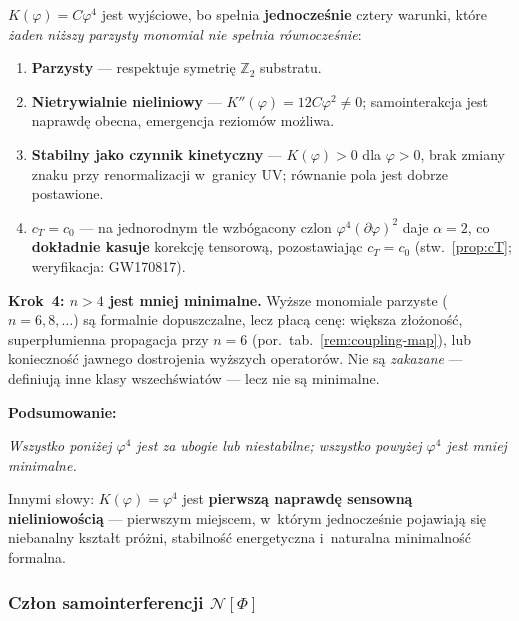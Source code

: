 \begin{remark}[Zasada minimalnej nieliniowo\'sci: dlaczego $K(\varphi) = \varphi^4$]
$K(\varphi) = C\varphi^4$ jest wyj\'sciowe, bo spe\l{}nia \textbf{jednocze\'snie}
cztery warunki, kt\'ore \emph{\.zaden ni\.zszy parzysty monomial nie spe\l{}nia
r\'ownocze\'snie}:
\begin{enumerate}[nosep]
  \item \textbf{Parzysty} --- respektuje symetri\k{e} $\mathbb{Z}_2$ substratu.
  \item \textbf{Nietrywialnie nieliniowy} --- $K''(\varphi) = 12C\varphi^2 \neq 0$;
        samointerakcja jest naprawd\k{e} obecna, emergencja reziom\'ow mo\.zliwa.
  \item \textbf{Stabilny jako czynnik kinetyczny} --- $K(\varphi) > 0$ dla $\varphi > 0$,
        brak zmiany znaku przy renormalizacji w~granicy UV;
        r\'ownanie pola jest dobrze postawione.
  \item \textbf{$c_T = c_0$} --- na jednorodnym tle wzb\'ogacony czlon
        $\varphi^4(\partial\varphi)^2$ daje $\alpha = 2$, co \textbf{dok\l{}adnie kasuje}
        korekcj\k{e} tensorow\k{a}, pozostawiaj\k{a}c $c_T = c_0$
        (stw.~\ref{prop:cT}; weryfikacja: GW170817).
\end{enumerate}

\medskip\noindent
\textbf{Krok~4: $n > 4$ jest mniej minimalne.}
Wy\.zsze monomiale parzyste ($n = 6, 8, \ldots$) s\k{a} formalnie dopuszczalne,
lecz p\l{}ac\k{a} cen\k{e}:
wi\k{e}ksza z\l{}o\.zono\'s\'c, superp\l{}umienna propagacja przy $n = 6$
(por.\ tab.~\ref{rem:coupling-map}),
lub konieczno\'s\'c jawnego dostrojenia wy\.zszych operator\'ow.
Nie s\k{a} \emph{zakazane} --- definiuj\k{a} inne klasy wszech\'swiat\'ow ---
lecz nie s\k{a} minimalne.

\medskip\noindent
\textbf{Podsumowanie:}
\begin{center}
\small
\emph{Wszystko poni\.zej $\varphi^4$ jest za ubogie lub niestabilne;
wszystko powy\.zej $\varphi^4$ jest mniej minimalne.}
\end{center}
Innymi s\l{}owy: $K(\varphi) = \varphi^4$ jest \textbf{pierwsz\k{a}
naprawd\k{e} sensown\k{a} nieliniowo\'sci\k{a}} --- pierwszym
miejscem, w~kt\'orym jednocze\'snie pojawiaj\k{a} si\k{e}
niebanalny kszta\l{}t próżni, stabilno\'s\'c energetyczna
i~naturalna minimalno\'s\'c formalna.
\end{remark}

\subsubsection{Cz\l{}on samointerferencji $\mathcal{N}[\Phi]$}

